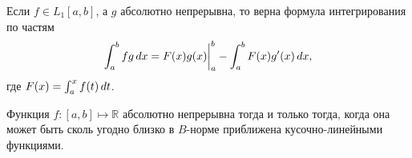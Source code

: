 
\begin{to_con}
    Если $f \in L_1 [a, b]$, а $g$ абсолютно непрерывна, то верна формула интегрирования по частям
    \begin{equation*}
        \int_a^b f g \, d x = F(x) g(x) \bigg|_a^b
        - \int_a^b F(x) g'(x) \, d x,
    \end{equation*}
    где $F(x) = \int_a^x f(t) \, d t$.
\end{to_con}


\begin{to_lem}
    Функция $f \colon [a, b] \mapsto \mathbb{R}$ абсолютно непрерывна тогда и только тогда, когда она может быть сколь угодно близко в $B$-норме приближена кусочно-линейными функциями.
\end{to_lem}

